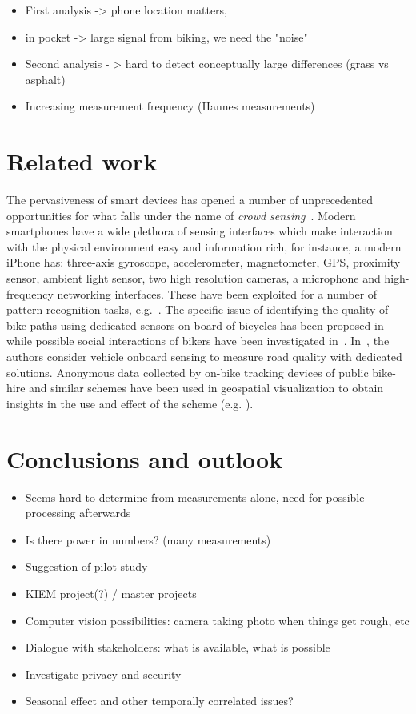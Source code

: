 \documentclass[a4paper,11pt]{article}
\begin{document}
\begin{itemize}\setlength{\itemsep}{-3pt}
\item First analysis -> phone location matters,
\item in pocket -> large signal from biking, we need the "noise"
\item Second analysis - > hard to detect conceptually large differences (grass vs asphalt)
\item Increasing measurement frequency (Hannes measurements)
\end{itemize}

\section{Related work}

The pervasiveness of smart devices has opened a number of unprecedented
opportunities for what falls under the name of \emph{crowd sensing}~\cite{gan:mob11}.
Modern smartphones have a wide plethora of sensing interfaces which make interaction with the physical
environment easy and information rich, for instance, a modern iPhone has: three-axis gyroscope, accelerometer, magnetometer, GPS, proximity
sensor, ambient light sensor, two high resolution cameras, a
microphone and high-frequency networking interfaces. These have been
exploited for a number of pattern recognition tasks, e.g.~\cite{fuj:iph10}. The specific issue of identifying the quality
of bike paths using dedicated sensors on board of bicycles has been
proposed in~\cite{eis:bik07} while possible social interactions of
bikers have been investigated
in~\cite{red:bik10}. In~\cite{eri:pot08}, the authors consider vehicle
onboard sensing to measure road quality with dedicated solutions.
Anonymous data collected by on-bike tracking devices of public bike-hire and similar schemes have been used in geospatial visualization to obtain insights in the use and effect of the scheme (e.g. \cite{krueger2014,wood2010}).

\section{Conclusions and outlook}

\begin{itemize}\setlength{\itemsep}{-3pt}
\item Seems hard to determine from measurements alone, need for possible processing afterwards
\item Is there power in numbers? (many measurements)
\item Suggestion of pilot study
\item KIEM project(?) / master projects
\item Computer vision possibilities: camera taking photo when things get rough, etc
\item Dialogue with stakeholders: what is available, what is possible
\item Investigate privacy and security
\item Seasonal effect and other temporally correlated issues?
\end{itemize}



\end{document}
